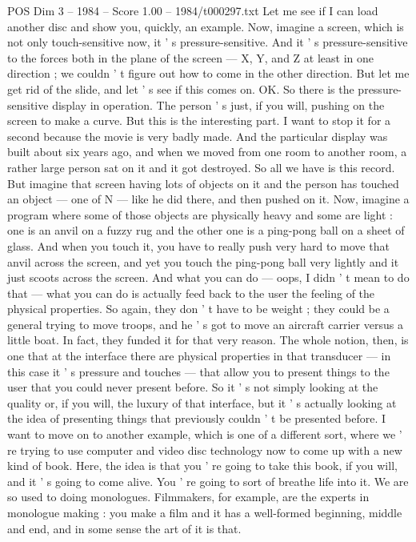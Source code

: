 \begin{textsample}{POS Dim 3 – 1984 – Score 1.00 – 1984/t000297.txt}
Let me see if I can load another disc and show you, quickly, an example.
Now, imagine a screen, which is not only touch-sensitive now, it ' s pressure-sensitive.
And it ' s pressure-sensitive to the forces both in the plane of the screen — X, Y, and Z at least in one direction ; we couldn ' t figure out how to come in the other direction.
But let me get rid of the slide, and let ' s see if this comes on.
OK.
So there is the pressure-sensitive display in operation.
The person ' s just, if you will, pushing on the screen to make a curve.
But this is the interesting part.
I want to stop it for a second because the movie is very badly made.
And the particular display was built about six years ago, and when we moved from one room to another room, a rather large person sat on it and it got destroyed.
So all we have is this record.
But imagine that screen having lots of objects on it and the person has touched an object — one of N — like he did there, and then pushed on it.
Now, imagine a program where some of those objects are physically heavy and some are light : one is an anvil on a fuzzy rug and the other one is a ping-pong ball on a sheet of glass.
And when you touch it, you have to really push very hard to move that anvil across the screen, and yet you touch the ping-pong ball very lightly and it just scoots across the screen.
And what you can do — oops, I didn ' t mean to do that — what you can do is actually feed back to the user the feeling of the physical properties.
So again, they don ' t have to be weight ; they could be a general trying to move troops, and he ' s got to move an aircraft carrier versus a little boat.
In fact, they funded it for that very reason.
The whole notion, then, is one that at the interface there are physical properties in that transducer — in this case it ' s pressure and touches — that allow you to present things to the user that you could never present before.
So it ' s not simply looking at the quality or, if you will, the luxury of that interface, but it ' s actually looking at the idea of presenting things that previously couldn ' t be presented before.
I want to move on to another example, which is one of a different sort, where we ' re trying to use computer and video disc technology now to come up with a new kind of book.
Here, the idea is that you ' re going to take this book, if you will, and it ' s going to come alive.
You ' re going to sort of breathe life into it.
We are so used to doing monologues.
Filmmakers, for example, are the experts in monologue making : you make a film and it has a well-formed beginning, middle and end, and in some sense the art of it is that.

\end{textsample}
